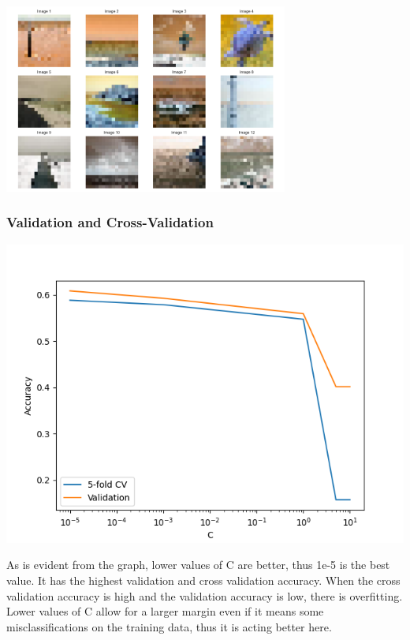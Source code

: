 \documentclass[12pt,a4paper]{article}
\begin{document}
\includegraphics[width=0.7\textwidth]{Assignment 2/q2/misclassified_4_2.png}

\subsubsection{Validation and Cross-Validation}
\includegraphics[width=\textwidth]{Assignment 2/q2/cross_validation_mult.png}

As is evident from the graph, lower values of C are better, thus 1e-5 is the best value. It has the highest validation and cross validation accuracy. When the cross validation accuracy is high and the validation accuracy is low, there is overfitting. Lower values of C allow for a larger margin even if it means some misclassifications on the training data, thus it is acting better here.
\end{document}
